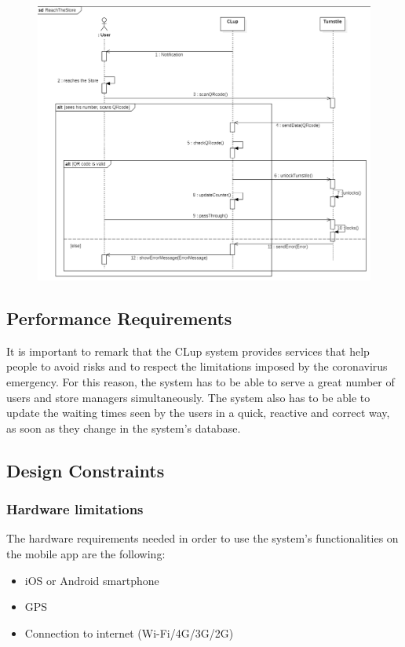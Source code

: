 \documentclass{article}
\begin{document}
\begin{figure}[H]
  \includegraphics[width=\linewidth]{ReachStoreSequence.png}
  
\end{figure}




\subsection{Performance Requirements}
It is important to remark that the CLup system provides services that help people to avoid risks and to respect the limitations imposed by the coronavirus emergency. For this reason, the system has to be able to serve a great number of users and store managers simultaneously. The system also has to be able to update the waiting times seen by the users in a quick, reactive and correct way, as soon as they change in the system’s database.

\subsection{Design Constraints}
\subsubsection{Hardware limitations}
The hardware requirements needed in order to use the system’s functionalities on the mobile app are the following:
\begin{itemize}
\item iOS or Android smartphone 
\item GPS
\item Connection to internet (Wi-Fi/4G/3G/2G) 
\end{itemize}
\end{document}
